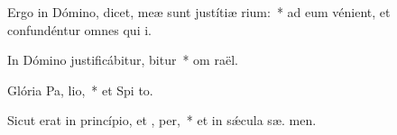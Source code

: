 \item Ergo in Dómino, dicet, meæ sunt justítiæ  rium:~* ad eum vénient, et confundéntur omnes qui  i.
\item In Dómino justificábitur,  bitur~* om  raël.
\item Glória Pa,  lio,~* et Spi to.
\item Sicut erat in princípio, et ,  per,~* et in sǽcula sæ. men.
